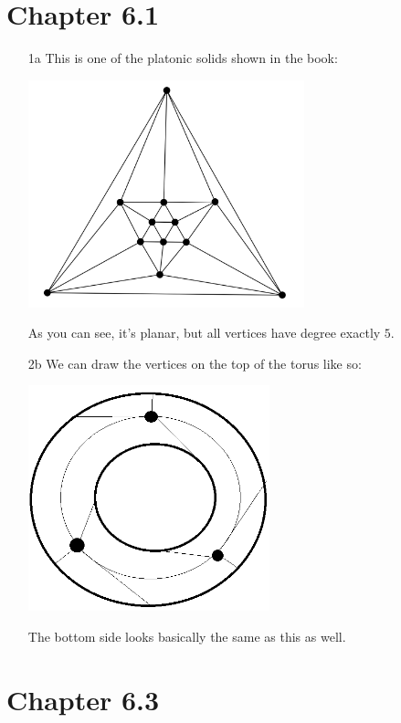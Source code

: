 \documentclass[12pt]{article}
\begin{document}
\pagebreak

\section{Chapter 6.1}

\begin{enumerate}
    \item[1a] This is one of the platonic solids shown in the book:
        \begin{center}
            \includegraphics[width=8cm]{img/hw4/deg5_planar}
        \end{center}
        As you can see, it's planar, but all vertices have degree exactly $5$.

    \item[2b] We can draw the vertices on the top of the torus like so:
        \begin{center}
            \includegraphics[width=7cm]{img/hw4/torus}
        \end{center}
        The bottom side looks basically the same as this as well.
\end{enumerate}

\pagebreak

\section{Chapter 6.3}
\end{document}
